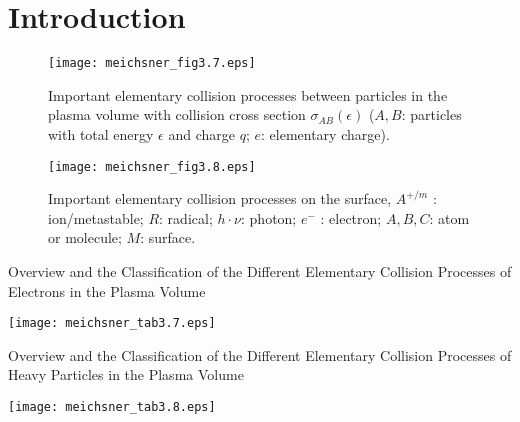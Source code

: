 \newcommand{\notenumber}{2019-xx}
\newcommand{\notetitle}{Background for \acp{pcm} for intense electron beam driven plasmas*}
\newcommand{\noteauthors}{P.~E.~Adamson}
\newcommand{\noteabstract}{Various \acp{pcm} are developed for intense electron
beam driven plasmas in Ar and air (dry and wet).  This work is part of an effort to 
develop \acp{prm} for a DTRA- and NRL-funded effort to update ICEPIC and MEEC++ to
model \ac{sgemp}.}
\newcommand{\notesponsor}{DTRA/RD-NTE 6.2 program}




\section{Introduction}

\begin{figure}
\texttt{[image: meichsner\_fig3.7.eps]}
\caption{Important elementary collision processes between particles in the plasma volume 
with collision cross section $\sigma_{AB} (\epsilon)$ ($A, B$: particles with total energy 
$\epsilon$ and charge $q$; $e$: elementary charge).\cite{meichsner2013}}
\end{figure}

\begin{figure}
\texttt{[image: meichsner\_fig3.8.eps]}
\caption{Important elementary collision processes on the surface, $A^{+/m}$ : ion/metastable;
$R$: radical; $h \cdot \nu$: photon; $e^−$ : electron; $A, B, C$: atom or molecule; $M$: surface.\cite{meichsner2013}}
\end{figure}

\begin{table}
\caption{Overview and the Classification of the Different Elementary Collision
Processes of Electrons in the Plasma Volume}
\texttt{[image: meichsner\_tab3.7.eps]}
\end{table}

\begin{table}
\caption{Overview and the Classification of the Different Elementary Collision
Processes of Heavy Particles in the Plasma Volume}
\texttt{[image: meichsner\_tab3.8.eps]}
\end{table}

